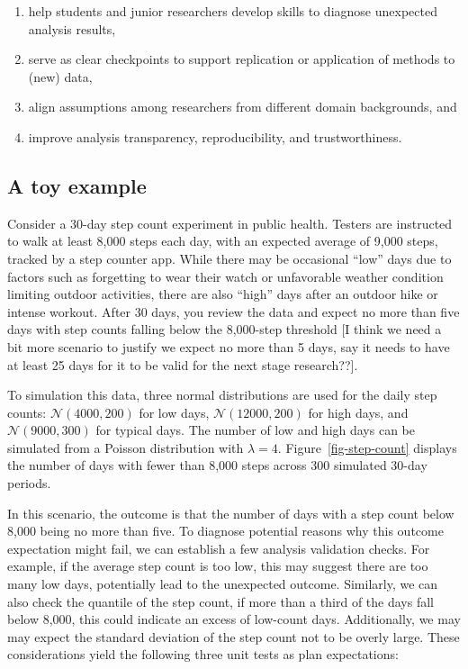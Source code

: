 \documentclass[
  12pt,
]{interact}
\providecommand{\tightlist}{%
  \setlength{\itemsep}{0pt}\setlength{\parskip}{0pt}}\usepackage{longtable,booktabs,array}
\begin{document}
\begin{enumerate}
\def\labelenumi{\arabic{enumi})}
\tightlist
\item
  help students and junior researchers develop skills to diagnose
  unexpected analysis results,
\item
  serve as clear checkpoints to support replication or application of
  methods to (new) data,
\item
  align assumptions among researchers from different domain backgrounds,
  and
\item
  improve analysis transparency, reproducibility, and trustworthiness.
\end{enumerate}

\subsection{A toy example}\label{a-toy-example}

Consider a 30-day step count experiment in public health. Testers are
instructed to walk at least 8,000 steps each day, with an expected
average of 9,000 steps, tracked by a step counter app. While there may
be occasional ``low'' days due to factors such as forgetting to wear
their watch or unfavorable weather condition limiting outdoor
activities, there are also ``high'' days after an outdoor hike or
intense workout. After 30 days, you review the data and expect no more
than five days with step counts falling below the 8,000-step threshold
{[}I think we need a bit more scenario to justify we expect no more than
5 days, say it needs to have at least 25 days for it to be valid for the
next stage research??{]}.

To simulation this data, three normal distributions are used for the
daily step counts: \(\mathcal{N}(4000, 200)\) for low days,
\(\mathcal{N}(12000, 200)\) for high days, and
\(\mathcal{N}(9000, 300)\) for typical days. The number of low and high
days can be simulated from a Poisson distribution with \(\lambda = 4\).
Figure~\ref{fig-step-count} displays the number of days with fewer than
8,000 steps across 300 simulated 30-day periods.

In this scenario, the outcome is that the number of days with a step
count below 8,000 being no more than five. To diagnose potential reasons
why this outcome expectation might fail, we can establish a few analysis
validation checks. For example, if the average step count is too low,
this may suggest there are too many low days, potentially lead to the
unexpected outcome. Similarly, we can also check the quantile of the
step count, if more than a third of the days fall below 8,000, this
could indicate an excess of low-count days. Additionally, we may may
expect the standard deviation of the step count not to be overly large.
These considerations yield the following three unit tests as plan
expectations:
\end{document}
